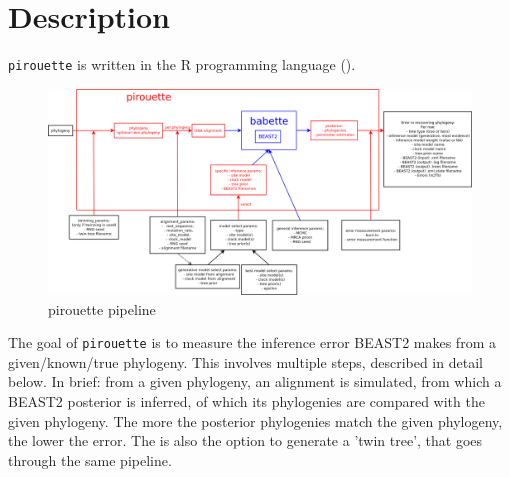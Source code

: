 \documentclass{article}
\begin{document}


\section{Description}

\verb;pirouette; is written in the R programming language (\cite{R}).

\begin{figure}
  \centering
  \includegraphics[width=\textwidth]{overview.png}
  \caption{pirouette pipeline}
  \label{fig:pipeline}
\end{figure}

The goal of \verb;pirouette; is to measure the inference error BEAST2
makes from a given/known/true phylogeny. This involves multiple steps,
described in detail below. 
In brief: from a given phylogeny, an alignment is simulated, from which a BEAST2
posterior is inferred, of which its phylogenies are compared with the given
phylogeny. The more the posterior phylogenies match the given phylogeny,
the lower the error. The is also the option to generate a 'twin tree',
that goes through the same pipeline.
\end{document}
